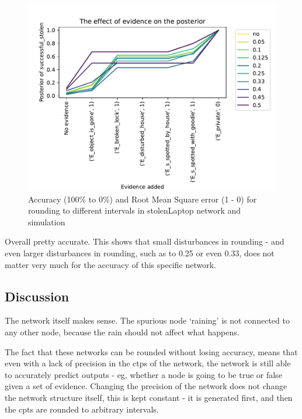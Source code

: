 \begin{figure}[h!]
\begin{center}
\includegraphics[width=\linewidth]{../experiments/StolenLaptop/plots/posterior_StolenLaptop.pdf}
\caption{Accuracy (100\% to 0\%) and Root Mean Square error (1 - 0) for rounding to different intervals in stolenLaptop network and simulation}
\label{laptopPosterior}
\end{center}
\end{figure}


Overall pretty accurate. This shows that small disturbances in rounding - and even larger disturbances in rounding, such as to 0.25 or even 0.33, does not matter very much for the accuracy of this specific network. 


\subsection{Discussion}

The network itself makes sense. The spurious node `raining' is not connected to any other node, because the rain should not affect what happens.

The fact that these networks can be rounded without losing accuracy, means that even with a lack of precision in the ctps of the network, the network is still able to accurately predict outputs - eg, whether a node is going to be true or false given a set of evidence. Changing the precision of the network does not change the network structure itself, this is kept constant - it is generated first, and then the cpts are rounded to arbitrary intervals. 

